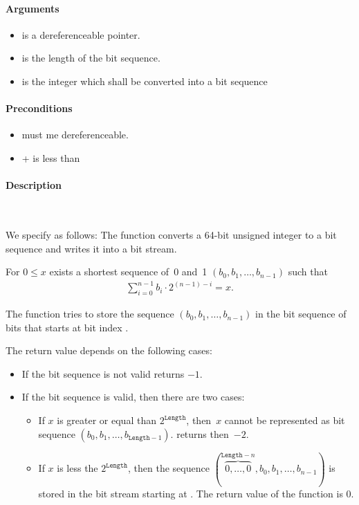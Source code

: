 \paragraph{Arguments}

\begin{itemize}
   \item  {} is a dereferenceable pointer.
   \item {} is the length of the bit sequence.
   \item {} is the integer which shall be converted into a bit sequence
\end{itemize}

\paragraph{Preconditions}
\begin{itemize}
    \item  {} must me dereferenceable.
    \item {} +  is less than 
\end{itemize}

\paragraph{Description}~

We specify \pokenext as follows:
The function \poke converts a 64-bit unsigned integer to a bit sequence and 
writes it into a bit stream.

For $0 \leq x$ exists a shortest sequence of~0 and~1
$(b_0, b_1,\ldots,b_{n - 1})$
such that
\begin{align}
    \sum_{i=0}^{n-1} b_i \cdot 2^{(n - 1) - i} = x.
\end{align}

The function \pokenext tries to store the sequence $(b_0, b_1,\ldots,b_{n - 1})$
in the bit sequence of  bits that starts
at bit index .

The return value depends on  the following cases:
\begin{itemize}
    \item  If the bit sequence is not valid \peeknext  returns $-1$.
    \item  If the bit sequence is valid, then there are two cases:
\begin{itemize}
\item
If $x$ is greater or equal than $2^\mathtt{Length}$, then~$x$
cannot be represented as bit sequence $(b_0, b_1,\ldots,b_{\mathtt{Length} - 1})$.
\pokenext returns then~$-2$.

\item
If $x$ is less the $2^{\mathtt{Length}}$, then  the sequence
$(\overbrace{0,\ldots,0}^{\mathtt{Length}-n},b_0, b_1,\ldots,b_{n - 1})$
is stored in the bit stream starting at .
The return value of the function \pokenext is 0.

\end{itemize}
\end{itemize}

